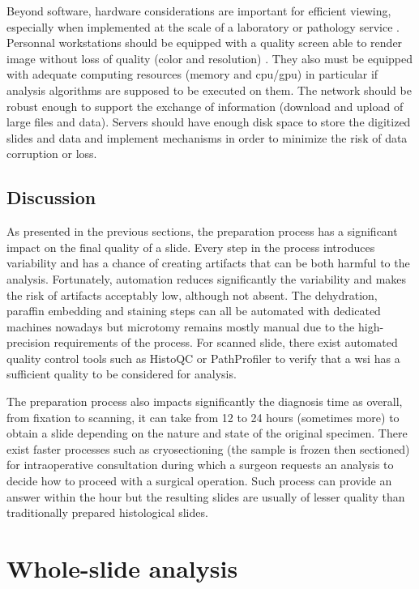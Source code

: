Beyond software, hardware considerations are important for efficient viewing, especially when implemented at the scale of a laboratory or pathology service \cite{temprana2022digipatics}. Personnal workstations should be equipped with a quality screen able to render image without loss of quality (color and resolution) \cite{rojo2015analysis}. They also must be equipped with adequate computing resources (memory and \acrshort{cpu}/\acrshort{gpu}) in particular if analysis algorithms are supposed to be executed on them. The network should be robust enough to support the exchange of information (\ie download and upload of large files and data). Servers should have enough disk space to store the digitized slides and data and implement mechanisms in order to minimize the risk of data corruption or loss. 

\subsection{Discussion}

As presented in the previous sections, the preparation process has a significant impact on the final quality of a slide. Every step in the process introduces variability and has a chance of creating artifacts that can be both harmful to the analysis. Fortunately, automation reduces significantly the variability and makes the risk of artifacts acceptably low, although not absent. The dehydration, paraffin embedding and staining steps can all be automated with dedicated machines nowadays but microtomy remains mostly manual due to the high-precision requirements of the process. For scanned slide, there exist automated quality control tools such as HistoQC \cite{janowczyk2019histoqc} or PathProfiler \cite{haghighat2021pathprofiler} to verify that a \acrshort{wsi} has a sufficient quality to be considered for analysis. 

The preparation process also impacts significantly the diagnosis time as overall, from fixation to scanning, it can take from 12 to 24 hours (sometimes more) to obtain a slide depending on the nature and state of the original specimen. There exist faster processes such as cryosectioning (\ie the sample is frozen then sectioned) for intraoperative consultation during which a surgeon requests an analysis to decide how to proceed with a surgical operation. Such process can provide an answer within the hour but the resulting slides are usually of lesser quality than traditionally prepared histological slides.

\section{Whole-slide analysis}
\label{sec:backdp:typicalanalysistasks}


